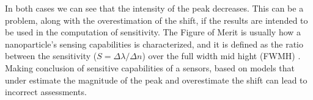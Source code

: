 In both cases we can see that the intensity of the peak decreases. This can be a problem, along with the overestimation of the shift,
if the results are intended to be used in the computation of sensitivity. The Figure of Merit is usually how a
nanoparticle’s sensing capabilities is characterized, and it is defined as the ratio between the 
sensitivity ($S = \Delta \lambda / \Delta n$) over the full width mid hight (FWMH) \cite{otte2012}. Making 
conclusion of sensitive capabilities of a sensors, based on models that under estimate the magnitude of the peak and 
overestimate the shift can lead to incorrect assessments.